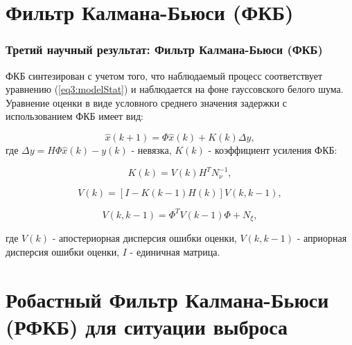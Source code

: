 \documentclass[10pt,pdf,hyperref={unicode}]{beamer}
\begin{document}
\section{Фильтр Калмана-Бьюси (ФКБ)}

\begin{frame}
\frametitle{Третий научный результат: Фильтр Калмана-Бьюси (ФКБ)}

ФКБ синтезирован с учетом того, что наблюдаемый процесс соответствует уравнению (\ref{eq3:modelStat}) и наблюдается на фоне гауссовского белого шума.
 Уравнение оценки в виде условного среднего значения задержки с использованием ФКБ имеет вид:


\begin{equation}\label{eq3:Estim_rel}
\hat{x}(k+1)=\Phi\hat{x}(k)+K(k)\Delta y,
\end{equation}
\noindent где $\Delta y=H\Phi\hat{x}(k)-y(k)$ - невязка, $K(k)$ - коэффициент усиления ФКБ:

\begin{equation}\label{eq3:K}
K(k)=V(k)H^TN_{\nu}^{-1},
\end{equation}
 
\begin{equation}\label{eq3:V}
V(k)=[I-K(k-1)H(k)]V(k,k-1),
\end{equation}


\begin{equation}\label{eq3:Vkk-1}
V(k,k-1)=\Phi^TV(k-1)\Phi+N_\xi,
\end{equation}

\noindent где $V(k)$ - апостериорная дисперсия ошибки оценки, $V(k,k-1)$ - априорная дисперсия ошибки оценки, $I$ - единичная матрица.

\end{frame}

\section{Робастный Фильтр Калмана-Бьюси (РФКБ) для ситуации выброса}
\end{document}
